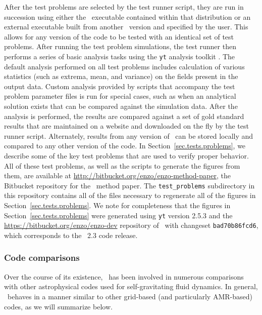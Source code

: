 After the test problems are selected by the test runner script, they
are run in succession using either the \enzo\ executable contained
within that distribution or an external executable built from another
\enzo\ version and specified by the user.  This allows for any version
of the code to be tested with an identical set of test problems.
After running the test problem simulations, the test runner then
performs a series of basic analysis tasks using the \texttt{yt}
analysis toolkit \citep{2011ApJS..192....9T, 2011arXiv1112.4482T}.
The default analysis performed on all test problems includes
calculation of various statistics (such as extrema, mean, and
variance) on the fields present in the output data.  Custom analysis
provided by scripts that accompany the test problem parameter files is
run for special cases, such as when an analytical solution exists that
can be compared against the simulation data.  After the analysis is
performed, the results are compared against a set of gold standard
results that are maintained on a website and downloaded on the fly by
the test runner script.  Alternately, results from any version of
\enzo\ can be stored locally and compared to any other version of the
code.  In Section~\ref{sec.tests.problems}, we describe some of the
key test problems that are used to verify proper behavior.  All of
these test problems, as well as the scripts to generate the figures
from them, are available at
\url{http://bitbucket.org/enzo/enzo-method-paper}, the Bitbucket
repository for the \enzo\ method paper.  The \texttt{test\_problems}
subdirectory in this repository contains all of the files necessary to
regenerate all of the figures in Section~\ref{sec.tests.problems}.  We
note for completeness that the figures in
Section~\ref{sec.tests.problems} were generated using \texttt{yt}
version 2.5.3 and the \url{https://bitbucket.org/enzo/enzo-dev}
repository of \enzo\ with changeset \texttt{bad70b86fcd6}, which
corresponds to the \enzo\ 2.3 code release.

\subsubsection{Code comparisons}
\label{sec.tests.compare}

Over the course of its existence, \enzo\ has been involved in numerous
comparisons with other astrophysical codes used for self-gravitating
fluid dynamics.  In general, \enzo\ behaves in a manner similar to
other grid-based (and particularly AMR-based) codes, as we will
summarize below.


